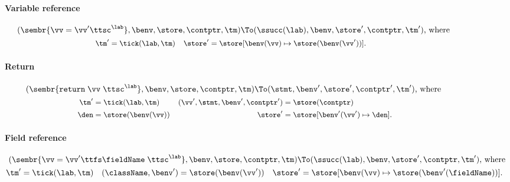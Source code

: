 \begin{figure}
\paragraph{Variable reference}
\begin{gather*}
  (
  \sembr{\vv = \vv' \ttsc^\lab},
  \benv,
  \store,
  \contptr,
  \tm
  )
  \To
  (
  \ssucc(\lab),
  \benv,
  \store',
  \contptr,
  \tm'
  )\text{, where }\\
\begin{small}\begin{align*}
  \tm' &= \tick(\lab, \tm) 
  &
  \store' &= \store[\benv(\vv) \mapsto \store(\benv(\vv'))]
  \text.
\end{align*}\end{small}\end{gather*}

\paragraph{Return}
\begin{gather*}
  (\sembr{\texttt{return}\; \vv\; \ttsc^\lab}, \benv, \store, \contptr, \tm)
  \To
  (\stmt, \benv', \store', \contptr', \tm')\text{, where }
  \\
\begin{small}\begin{align*}
  \tm' &= \tick(\lab, \tm)
  &
  (\vv',\stmt, \benv', \contptr') &= \store(\contptr)
  \\
  \den &= \store(\benv(\vv))
  &
  \store' &= \store[\benv'(\vv') \mapsto \den]
  \text.
\end{align*}\end{small}\end{gather*}


\paragraph{Field reference}
\begin{gather*}
  (
  \sembr{\vv = \vv'\ttfs \fieldName\; \ttsc^\lab},
  \benv,
  \store,
  \contptr,
  \tm
  )
  \To
  (
  \ssucc(\lab),
  \benv,
  \store',
  \contptr,
  \tm'
  )\text{, where }\\
\begin{aligned}
  \tm' & = \tick(\lab, \tm)
  &
  (\className, \benv') &= \store(\benv(\vv'))  
  &
  \store' &= \store[\benv(\vv) \mapsto \store(\benv'(\fieldName))]
  \text.
\end{aligned}
\end{gather*}





\end{figure}
